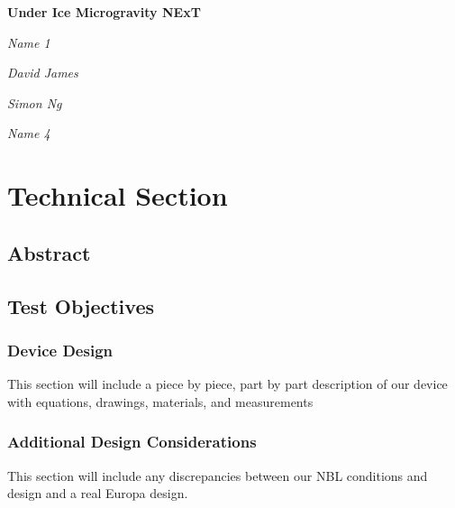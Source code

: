 \documentclass{article}
\begin{document}
\begin{titlepage}
\begin{center}

    \vspace{3cm}
    {\huge\bfseries Under Ice Microgravity NExT\par}
    \vspace{10cm}
    {\Large\itshape Name 1\par}
    {\Large\itshape David James\par}
    {\Large\itshape Simon Ng\par}
    {\Large\itshape Name 4\par}

\end{center}
\end{titlepage}

\begin{titlepage}
\tableofcontents
\end{titlepage}

\section{Technical Section}
\subsection{Abstract}

\subsection{Test Objectives}

\subsubsection{Device Design}
This section will include a piece by piece, part by part description of our device with equations, drawings, materials, and measurements

\subsubsection{Additional Design Considerations}
This section will include any discrepancies between our NBL conditions and design and a real Europa design.
\end{document}

